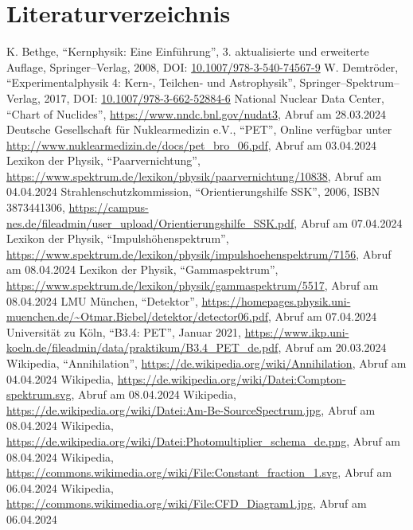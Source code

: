 \documentclass[12pt,a4paper]{scrartcl}
\numberwithin{equation}{section} %
\begin{document}
\clearpage
\hypertarget{literatur}{\section{Literaturverzeichnis}\label{literatur}}
\renewcommand{\section}[2]{}

\begin{thebibliography}{99}
	K. Bethge, ``Kernphysik: Eine Einführung'', 3. aktualisierte und
	erweiterte Auflage, Springer--Verlag, 2008, DOI:
	\href{https://doi.org/10.1007/978-3-540-74567-9}{10.1007/978-3-540-74567-9}
	W. Demtröder, ``Experimentalphysik 4: Kern-, Teilchen- und
	Astrophysik'', Springer--Spektrum--Verlag, 2017, DOI:
	\href{https://link.springer.com/book/10.1007/978-3-662-52884-6}{10.1007/978-3-662-52884-6}
	National Nuclear Data Center, ``Chart of Nuclides'',
	\url{https://www.nndc.bnl.gov/nudat3}, Abruf am 28.03.2024
	Deutsche Gesellschaft für Nuklearmedizin e.V., ``PET'',
	Online verfügbar unter
	\url{http://www.nuklearmedizin.de/docs/pet_bro_06.pdf},
	Abruf am 03.04.2024
	Lexikon der Physik, ``Paarvernichtung'',
	\url{https://www.spektrum.de/lexikon/physik/paarvernichtung/10838},
	Abruf am 04.04.2024
	Strahlenschutzkommission, ``Orientierungshilfe SSK'', 2006, ISBN 3873441306,
	\url{https://campus-nes.de/fileadmin/user_upload/Orientierungshilfe_SSK.pdf}, Abruf am 07.04.2024
	Lexikon der Physik, ``Impulshöhenspektrum'',
	\url{https://www.spektrum.de/lexikon/physik/impulshoehenspektrum/7156},
	Abruf am 08.04.2024
	Lexikon der Physik, ``Gammaspektrum'',
	\url{https://www.spektrum.de/lexikon/physik/gammaspektrum/5517},
	Abruf am 08.04.2024
	LMU München, ``Detektor'',
	\url{https://homepages.physik.uni-muenchen.de/~Otmar.Biebel/detektor/detector06.pdf},
	Abruf am 07.04.2024
	Universität zu Köln, ``B3.4: PET'',
	Januar 2021,
	\url{https://www.ikp.uni-koeln.de/fileadmin/data/praktikum/B3.4\_PET\_de.pdf},
	Abruf am 20.03.2024
	Wikipedia, ``Annihilation'',
	\url{https://de.wikipedia.org/wiki/Annihilation}, Abruf am 04.04.2024
	Wikipedia,
	\url{https://de.wikipedia.org/wiki/Datei:Compton-spektrum.svg},
	Abruf am 08.04.2024
	Wikipedia,
	\url{https://de.wikipedia.org/wiki/Datei:Am-Be-SourceSpectrum.jpg},
	Abruf am 08.04.2024
	Wikipedia,
	\url{https://de.wikipedia.org/wiki/Datei:Photomultiplier_schema_de.png},
	Abruf am 08.04.2024
	Wikipedia,
	\url{https://commons.wikimedia.org/wiki/File:Constant_fraction_1.svg},
	Abruf am 06.04.2024
	Wikipedia,
	\url{https://commons.wikimedia.org/wiki/File:CFD_Diagram1.jpg},
	Abruf am 06.04.2024
\end{thebibliography}
\end{document}
